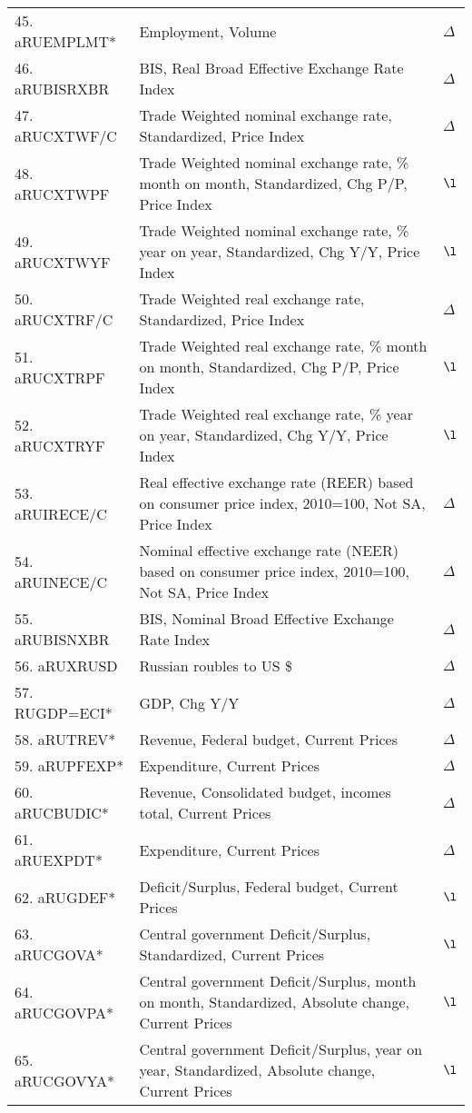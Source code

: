 \documentclass[a4paper, 14pt]{article}
\begin{document}
\begin{center}
\begin{longtable}{p{5.5cm} p{10cm} p{0.15cm}}
	45. aRUEMPLMT* &  Employment, Volume & $\Delta$\\
	46. aRUBISRXBR &  BIS, Real Broad Effective Exchange Rate Index & $\Delta$\\
	47. aRUCXTWF/C &  Trade Weighted nominal exchange rate, Standardized, Price Index & $\Delta$\\
	48. aRUCXTWPF &  Trade Weighted nominal exchange rate, \% month on month, Standardized, Chg P/P, Price Index & $\l$\\
	49. aRUCXTWYF &  Trade Weighted nominal exchange rate, \% year on year, Standardized, Chg Y/Y, Price Index & $\l$\\
	50. aRUCXTRF/C &  Trade Weighted real exchange rate, Standardized, Price Index & $\Delta$\\
	51. aRUCXTRPF &  Trade Weighted real exchange rate, \% month on month, Standardized, Chg P/P, Price Index & $\l$\\
	52. aRUCXTRYF &  Trade Weighted real exchange rate, \% year on year, Standardized, Chg Y/Y, Price Index & $\l$\\
	53. aRUIRECE/C &  Real effective exchange rate (REER) based on consumer price index, 2010=100, Not SA, Price Index & $\Delta$\\
	54. aRUINECE/C &  Nominal effective exchange rate (NEER) based on consumer price index, 2010=100, Not SA, Price Index & $\Delta$\\
	55. aRUBISNXBR &  BIS, Nominal Broad Effective Exchange Rate Index & $\Delta$\\
	56. aRUXRUSD &  Russian roubles to US \$ & $\Delta$\\
	57. RUGDP=ECI* &  GDP, Chg Y/Y & $\Delta$\\
	58. aRUTREV* &  Revenue, Federal budget, Current Prices & $\Delta$\\
	59. aRUPFEXP* &  Expenditure, Current Prices & $\Delta$\\
	60. aRUCBUDIC* &  Revenue, Consolidated budget, incomes total, Current Prices & $\Delta$\\
	61. aRUEXPDT* &  Expenditure, Current Prices & $\Delta$\\
	62. aRUGDEF* &  Deficit/Surplus, Federal budget, Current Prices & $\l$\\
	63. aRUCGOVA* &  Central government Deficit/Surplus, Standardized, Current Prices & $\l$\\
	64. aRUCGOVPA* &  Central government Deficit/Surplus, month on month, Standardized, Absolute change, Current Prices & $\l$\\
	65. aRUCGOVYA* &  Central government Deficit/Surplus, year on year, Standardized, Absolute change, Current Prices & $\l$\\

\end{longtable}
\end{center}
\end{document}

